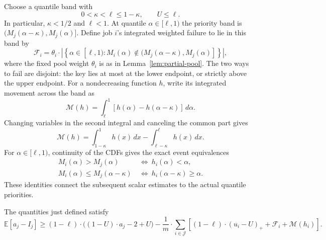 Choose a quantile band with
\begin{equation}
 0<\kappa<\ell\le1-\kappa,\qquad U\le\ell.
 \label{eq:meta-band-domain}
\end{equation}
In particular, $\kappa<1/2$ and $\ell<1$.
At quantile $\alpha\in[\ell,1)$
the priority band is $(M_j(\alpha-\kappa),M_j(\alpha)]$.
Define job $i$'s integrated weighted failure to lie in this band by
\[
 \mathcal F_i=\theta_i\cdot\left|\left\{\alpha\in[\ell,1):
 M_i(\alpha)\notin(M_j(\alpha-\kappa),M_j(\alpha)]\right\}\right|,
\]
where the fixed pool weight $\theta_i$ is as in Lemma~\ref{lem:partial-pool}.
The two ways to fail are disjoint: the key lies at most at the lower
endpoint, or strictly above the upper endpoint. For a nondecreasing function
$h$, write its integrated movement across the band as
\[
 \mathcal M(h)=\int_\ell^1
           [h(\alpha)-h(\alpha-\kappa)]\,d\alpha.
\]
Changing variables in the second integral and canceling the common part gives
\[
 \mathcal M(h)=\int_{1-\kappa}^{1}h(x)\,dx
 -\int_{\ell-\kappa}^{\ell}h(x)\,dx.
\]
For $\alpha\in[\ell,1)$, continuity of the CDFs gives the
exact event equivalences
\[
 \begin{aligned}
 M_i(\alpha)>M_j(\alpha)
   &\ \Longleftrightarrow\ h_i(\alpha)<\alpha,\\
 M_i(\alpha)\le M_j(\alpha-\kappa)
   &\ \Longleftrightarrow\ h_i(\alpha-\kappa)\ge\alpha.
 \end{aligned}
\]
These identities connect the subsequent
scalar estimates to the actual quantile priorities.
\begin{lemma}
\label{lem:integrated-partial-pool}
The quantities just defined satisfy
\begin{equation}
 \mathbb E[a_j-I_j]\ge (1-\ell)\cdot\bigl((1-U)\cdot a_j-2+U\bigr)
 -\frac1m\cdot\sum_{i\in\mathcal J}\left[(1-\ell)\cdot(u_i-U)_++\mathcal F_i+\mathcal M(h_i)\right].
 \label{eq:meta-complete-loss}
\end{equation}
\end{lemma}
